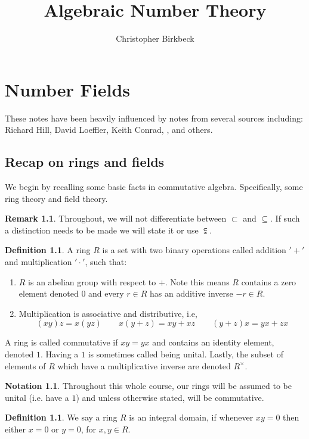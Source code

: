 \documentclass[11pt,a4paper]{report}
\title{Algebraic Number Theory}
\author{Christopher Birkbeck}
\theoremstyle{plain}
\theoremstyle{definition}
\newtheorem{defn}[subsection]{Definition}
\theoremstyle{definition}
\newtheorem*{rmrk*}{Remark}
\newtheorem{nota}[subsection]{Notation}
\begin{document}
	\maketitle
	\tableofcontents
	
	
	
	
	\chapter{Number Fields}
	
	These notes have been heavily influenced by notes from several sources including: Richard Hill, David Loeffler, Keith Conrad, \cite{marcus},\cite{Samuel} and others.
	
	\section{Recap on rings and fields}
	We begin by recalling some basic facts in commutative algebra. Specifically, some ring theory and field theory.	
	
	
	\begin{rmrk*}
		Throughout, we will not differentiate between $\subset$ and $\subseteq$. If such a distinction needs to be made we will state it or use $\subsetneqq$. 
	\end{rmrk*}
	
	\begin{defn}
		A ring $R$ is a set with two binary operations called addition $'+'$ and multiplication $'\cdot'$, such that:
		
		\begin{enumerate}
			\item $R$ is an abelian group with respect to  $+$. Note this means $R$ contains a zero element denoted $0$ and every $r \in R$ has an additive inverse $-r \in R$.
			\item Multiplication is associative and distributive, i.e, \[(xy)z=x(yz) \qquad x(y+z)=xy+xz \qquad (y+z)x=yx+zx\]
		\end{enumerate}
		A ring is called commutative if $xy=yx$ and contains an identity element, denoted $1$. Having a $1$ is sometimes called being unital. Lastly, the subset of elements of $R$ which have a multiplicative inverse are denoted $R^\times$.
		
	\end{defn}
	
	
	
	
	\begin{nota}
		Throughout this whole course, our rings will be assumed to be unital (i.e. have a $1$) and unless otherwise stated, will be commutative.
	\end{nota}
	\begin{defn}
		We say a ring $R$ is an integral domain, if whenever $xy=0$ then either $x=0$ or $y=0$, for $x,y \in R$.
	\end{defn}
	
\end{document}
